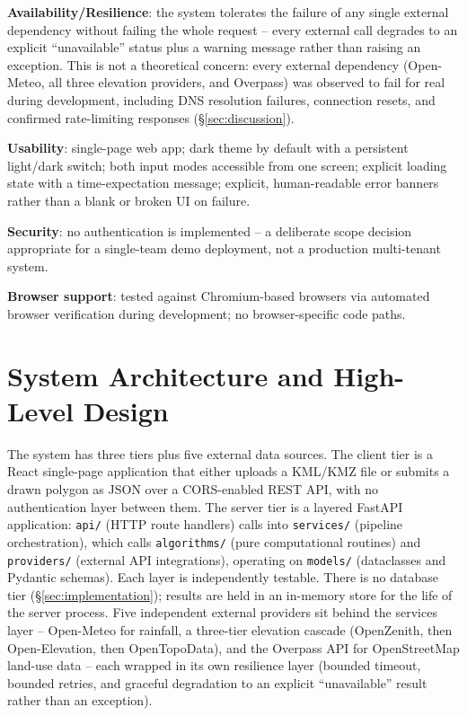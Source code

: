\documentclass[manuscript,screen]{acmart}
\begin{document}
\textbf{Availability/Resilience}: the system tolerates the failure of any
single external dependency without failing the whole request -- every
external call degrades to an explicit ``unavailable'' status plus a
warning message rather than raising an exception. This is not a
theoretical concern: every external dependency (Open-Meteo, all three
elevation providers, and Overpass) was observed to fail for real during
development, including DNS resolution failures, connection resets, and
confirmed rate-limiting responses (\S\ref{sec:discussion}).

\textbf{Usability}: single-page web app; dark theme by default with a
persistent light/dark switch; both input modes accessible from one
screen; explicit loading state with a time-expectation message; explicit,
human-readable error banners rather than a blank or broken UI on failure.

\textbf{Security}: no authentication is implemented -- a deliberate scope
decision appropriate for a single-team demo deployment, not a production
multi-tenant system.

\textbf{Browser support}: tested against Chromium-based browsers via
automated browser verification during development; no browser-specific
code paths.

\section{System Architecture and High-Level Design}
\label{sec:architecture}

The system has three tiers plus five external data sources. The client
tier is a React single-page application that either uploads a KML/KMZ
file or submits a drawn polygon as JSON over a CORS-enabled REST API, with
no authentication layer between them. The server tier is a layered FastAPI
application: \texttt{api/} (HTTP route handlers) calls into
\texttt{services/} (pipeline orchestration), which calls
\texttt{algorithms/} (pure computational routines) and \texttt{providers/}
(external API integrations), operating on \texttt{models/} (dataclasses
and Pydantic schemas). Each layer is independently testable. There is no
database tier (\S\ref{sec:implementation}); results are held in an
in-memory store for the life of the server process. Five independent
external providers sit behind the services layer -- Open-Meteo for
rainfall, a three-tier elevation cascade (OpenZenith, then Open-Elevation,
then OpenTopoData), and the Overpass API for OpenStreetMap land-use data
-- each wrapped in its own resilience layer (bounded timeout, bounded
retries, and graceful degradation to an explicit ``unavailable'' result
rather than an exception).
\end{document}
